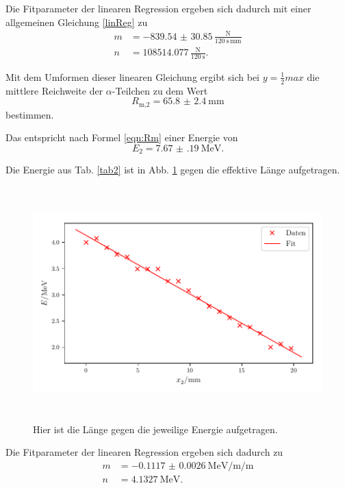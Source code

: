\noindent Die Fitparameter der linearen Regression ergeben sich dadurch mit einer allgemeinen Gleichung \eqref{linReg} zu 
\begin{align*}
    m &= -\num{839.54(3085)}\, \frac{\text{N}}{\SI{120}{\second} \, \si{\milli\meter}} \\
    n &= \num{108514.077} \, \frac{\text{N}}{\SI{120}{\second}} .
\end{align*}


\noindent Mit dem Umformen dieser linearen Gleichung ergibt sich bei $y = \frac{1}{2} max$ die mittlere Reichweite der $\alpha$-Teilchen zu dem Wert %
\begin{equation*}
    R_\text{m,2} = \SI{65.8(24)}{\milli\meter}
\end{equation*}
bestimmen.

\noindent Das entspricht nach Formel \eqref{eqn:Rm} einer Energie von %
\begin{equation*}
    E_2 = \SI{7.67(19)}{\mega\electronvolt}.
\end{equation*}

\noindent Die Energie aus Tab. \ref{tab2} ist in Abb. \ref{fig:energie2} gegen die effektive Länge aufgetragen.
\begin{figure}
    \centering
    \includegraphics[width=15cm, height=9cm]{build/plotd.pdf}
    \caption{Hier ist die Länge gegen die jeweilige Energie aufgetragen.}
    \label{fig:energie2}
\end{figure}

\noindent Die Fitparameter der linearen Regression ergeben sich dadurch zu 
\begin{align*}
    m &= -\SI{0.1117(26)}{\mega\electronvolt\per\milli\per\meter} \\
    n &= \SI{4.1327}{\mega\electronvolt} .
\end{align*}

